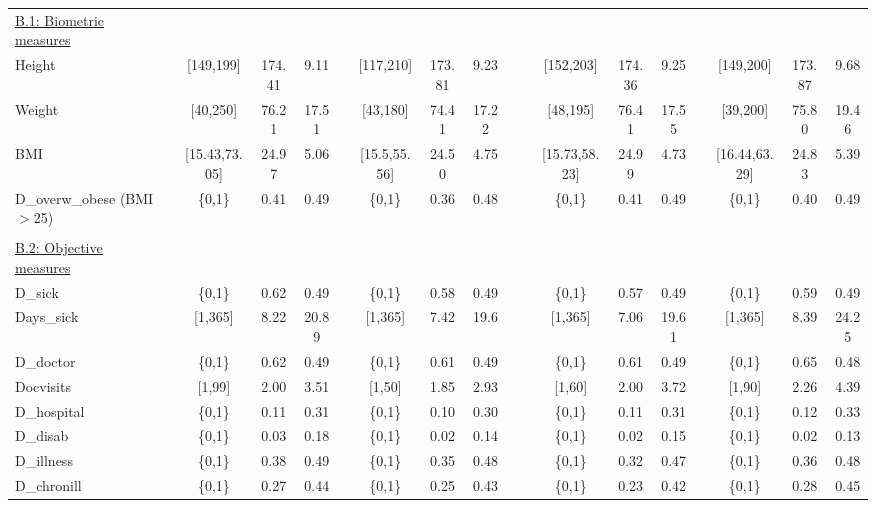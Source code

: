 \begin{center}
{\begin{longtable}{l*{17}{c}}
\\	%
\underline{B.1: Biometric measures}\\
Height & & [149,199] & 174.41 & 9.11 &  & [117,210] & 173.81 & 9.23 &  &  & [152,203] & 174.36 & 9.25 &  & [149,200] & 173.87 & 9.68 \\ 
Weight & & [40,250] & 76.21 & 17.51 &  & [43,180] & 74.41 & 17.22 &  &  & [48,195] & 76.41 & 17.55 &  & [39,200] & 75.80 & 19.46 \\ 
BMI & & [15.43,73.05] & 24.97 & 5.06 &  & [15.5,55.56] & 24.50 & 4.75 &  &  & [15.73,58.23] & 24.99 & 4.73 &  & [16.44,63.29] & 24.83 & 5.39 \\ 
D\_overw\_obese (BMI$ >$25) & & \{0,1\} &0.41 &0.49 &  & \{0,1\} &0.36 &0.48 &  &  & \{0,1\} &0.41 &0.49 &  & \{0,1\} &0.40 &0.49 \\ 




\\	%
\underline{B.2: Objective measures}\\
D\_sick & & \{0,1\} &0.62 &0.49 &  & \{0,1\} &0.58 &0.49 &  &  & \{0,1\} &0.57 &0.49 &  & \{0,1\} &0.59 &0.49 \\ 
Days\_sick & & [1,365] & 8.22 & 20.89 &  & [1,365] & 7.42 & 19.6 &  &  & [1,365] & 7.06 & 19.61 &  & [1,365] & 8.39 & 24.25 \\ 
D\_doctor & & \{0,1\} &0.62 &0.49 &  & \{0,1\} &0.61 &0.49 &  &  & \{0,1\} &0.61 &0.49 &  & \{0,1\} &0.65 &0.48 \\ 
Docvisits & & [1,99] & 2.00 & 3.51 &  & [1,50] & 1.85 & 2.93 &  &  & [1,60] & 2.00 & 3.72 &  & [1,90] & 2.26 & 4.39 \\ 
D\_hospital & & \{0,1\} &0.11 &0.31 &  & \{0,1\} &0.10 &0.30 &  &  & \{0,1\} &0.11 &0.31 &  & \{0,1\} &0.12 &0.33 \\ 
D\_disab & & \{0,1\} &0.03 &0.18 &  & \{0,1\} &0.02 &0.14 &  &  & \{0,1\} &0.02 &0.15 &  & \{0,1\} &0.02 &0.13 \\ 
D\_illness & & \{0,1\} &0.38 &0.49 &  & \{0,1\} &0.35 &0.48 &  &  & \{0,1\} &0.32 &0.47 &  & \{0,1\} &0.36 &0.48 \\ 
D\_chronill & & \{0,1\} &0.27 &0.44 &  & \{0,1\} &0.25 &0.43 &  &  & \{0,1\} &0.23 &0.42 &  & \{0,1\} &0.28 &0.45 \\ 







\end{longtable}}
\end{center}

